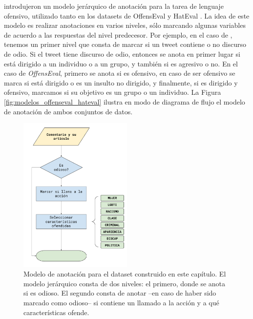 \citet{zampieri2019predicting} introdujeron un modelo jerárquico de anotación para la tarea de lenguaje ofensivo, utilizado tanto en los datasets de OffensEval \cite{zampieri2019semeval2019} y HatEval \cite{hateval2019semeval}. La idea de este modelo es realizar anotaciones en varios niveles, sólo marcando algunas variables de acuerdo a las respuestas del nivel predecesor. Por ejemplo, en el caso de \hateval{}, tenemos un primer nivel que consta de marcar si un tweet contiene o no discurso de odio. Si el tweet tiene discurso de odio, entonces se anota en primer lugar si está dirigido a un individuo o a un grupo, y también si es agresivo o no. En el caso de \emph{OffensEval}, primero se anota si es ofensivo, en caso de ser ofensivo se marca si está dirigido o es un insulto no dirigido, y finalmente, si es dirigido y ofensivo, marcamos si su objetivo es un grupo o un individuo.  La Figura \ref{fig:modelos_offenseval_hateval} ilustra en modo de diagrama de flujo el modelo de anotación de ambos conjuntos de datos.


%
%
%



\begin{figure}[t]
    \centering
    \includegraphics[width=0.5\textwidth]{img/05/annotation_model.pdf}
    \caption{Modelo de anotación para el dataset construido en este capítulo. El modelo jerárquico consta de dos niveles: el primero, donde se anota si es odioso. El segundo consta de anotar --en caso de haber sido marcado como odioso-- si contiene un llamado a la acción y a qué características ofende.}
    \label{fig:annotation_model}
\end{figure}


